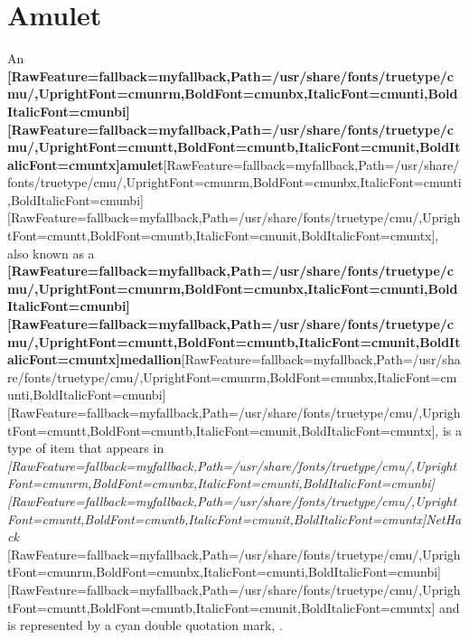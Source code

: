 \chapter{Amulet}
An {\bfseries \allowbreak{}\setmainfont{cmunbx.ttf}[RawFeature={fallback=myfallback},Path=/usr/share/fonts/truetype/cmu/,UprightFont=cmunrm,BoldFont=cmunbx,ItalicFont=cmunti,BoldItalicFont=cmunbi]\setmonofont{cmunbx.ttf}[RawFeature={fallback=myfallback},Path=/usr/share/fonts/truetype/cmu/,UprightFont=cmuntt,BoldFont=cmuntb,ItalicFont=cmunit,BoldItalicFont=cmuntx]\bfseries amulet}\allowbreak{}\setmainfont{cmunrm.ttf}[RawFeature={fallback=myfallback},Path=/usr/share/fonts/truetype/cmu/,UprightFont=cmunrm,BoldFont=cmunbx,ItalicFont=cmunti,BoldItalicFont=cmunbi]\setmonofont{cmunrm.ttf}[RawFeature={fallback=myfallback},Path=/usr/share/fonts/truetype/cmu/,UprightFont=cmuntt,BoldFont=cmuntb,ItalicFont=cmunit,BoldItalicFont=cmuntx], also known as a {\bfseries \allowbreak{}\setmainfont{cmunbx.ttf}[RawFeature={fallback=myfallback},Path=/usr/share/fonts/truetype/cmu/,UprightFont=cmunrm,BoldFont=cmunbx,ItalicFont=cmunti,BoldItalicFont=cmunbi]\setmonofont{cmunbx.ttf}[RawFeature={fallback=myfallback},Path=/usr/share/fonts/truetype/cmu/,UprightFont=cmuntt,BoldFont=cmuntb,ItalicFont=cmunit,BoldItalicFont=cmuntx]\bfseries medallion}\allowbreak{}\setmainfont{cmunrm.ttf}[RawFeature={fallback=myfallback},Path=/usr/share/fonts/truetype/cmu/,UprightFont=cmunrm,BoldFont=cmunbx,ItalicFont=cmunti,BoldItalicFont=cmunbi]\setmonofont{cmunrm.ttf}[RawFeature={fallback=myfallback},Path=/usr/share/fonts/truetype/cmu/,UprightFont=cmuntt,BoldFont=cmuntb,ItalicFont=cmunit,BoldItalicFont=cmuntx], is a type of item\footnotemark[17] that appears in {\itshape \allowbreak{}\setmainfont{cmunti.ttf}[RawFeature={fallback=myfallback},Path=/usr/share/fonts/truetype/cmu/,UprightFont=cmunrm,BoldFont=cmunbx,ItalicFont=cmunti,BoldItalicFont=cmunbi]\setmonofont{cmunti.ttf}[RawFeature={fallback=myfallback},Path=/usr/share/fonts/truetype/cmu/,UprightFont=cmuntt,BoldFont=cmuntb,ItalicFont=cmunit,BoldItalicFont=cmuntx]\itshape NetHack\footnotemark[18]}{$\text{ }$}\allowbreak{}\setmainfont{cmunrm.ttf}[RawFeature={fallback=myfallback},Path=/usr/share/fonts/truetype/cmu/,UprightFont=cmunrm,BoldFont=cmunbx,ItalicFont=cmunti,BoldItalicFont=cmunbi]\setmonofont{cmunrm.ttf}[RawFeature={fallback=myfallback},Path=/usr/share/fonts/truetype/cmu/,UprightFont=cmuntt,BoldFont=cmuntb,ItalicFont=cmunit,BoldItalicFont=cmuntx] and is represented by a cyan double quotation mark\footnotemark[19], .


